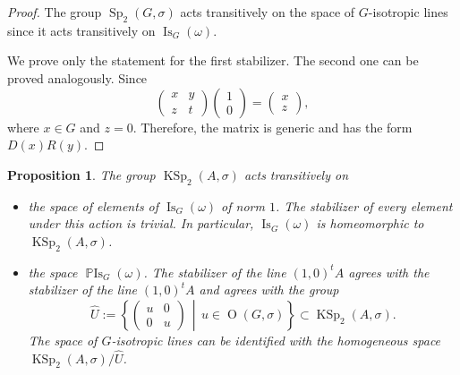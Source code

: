 \documentclass[a4paper,oneside,11pt]{amsart}
\DeclareMathOperator{\Sp}{Sp}
\DeclareMathOperator{\OO}{O}
\DeclareMathOperator{\KSp}{KSp}
\DeclareMathOperator{\Is}{Is}
\DeclareMathOperator{\PIs}{\mathbb{P}Is}
\newcommand{\midwd}{\,\middle\vert\,}
\theoremstyle{plain}
\newtheorem{prop}[teo]{Proposition}
\theoremstyle{definition}
\theoremstyle{remark}
\begin{document}
\begin{proof} The group $\Sp_2(G,\sigma)$ acts transitively on the space of $G$-isotropic lines since it acts transitively on $\Is_G(\omega)$.

We prove only the statement for the first stabilizer. The second one can be proved analogously. Since
$$\begin{pmatrix}
x & y \\
z & t
\end{pmatrix}
\begin{pmatrix}
1 \\ 0
\end{pmatrix}=\begin{pmatrix}
x \\ z
\end{pmatrix},$$
where $x\in G$ and $z=0$. Therefore, the matrix is generic and has the form $D(x)R(y)$.
\end{proof}

\begin{prop} The group $\KSp_2(A,\sigma)$ acts transitively on
    \begin{itemize}
    \item the space of elements of $\Is_G(\omega)$ of norm $1$. The stabilizer of every element under this action is trivial. In particular, $\Is_G(\omega)$ is homeomorphic to $\KSp_2(A,\sigma)$.
    \item the space $\PIs_G(\omega)$. The stabilizer of the line $(1,0)^tA$ agrees with the stabilizer of the line $(1,0)^tA$ and agrees with the group 
    $$\hat U:= \left\{\begin{pmatrix} u & 0 \\ 0 & u\end{pmatrix}\midwd u\in \OO(G,\sigma)\right\}\subset \KSp_2(A,\sigma).$$
    The space of $G$-isotropic lines can be identified with the homogeneous space $\KSp_2(A,\sigma)/\hat U$.
\end{itemize}
\end{prop}
\end{document}
